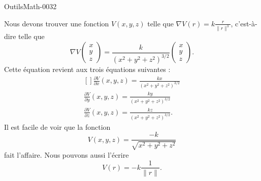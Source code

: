 
\begin{corrige}{OutilsMath-0032}

    Nous devons trouver une fonction $V(x,y,z)$ telle que $\nabla V(r)=k\frac{ r }{ \| r \|^3 }$, c'est-à-dire telle que
    \begin{equation}
        \nabla V\begin{pmatrix}
            x    \\ 
            y    \\ 
            z    
        \end{pmatrix}=\frac{ k }{ (x^2+y^2+z^2)^{3/2} }\begin{pmatrix}
            x    \\ 
            y    \\ 
            z    
        \end{pmatrix}.
    \end{equation}
    Cette équation revient aux trois équations suivantes :
    \begin{equation}
        \begin{aligned}[]
            \frac{ \partial V }{ \partial x }(x,y,z)=\frac{ kx }{ (x^2+y^2+z^2)^{3/2} }\\
            \frac{ \partial V }{ \partial y }(x,y,z)=\frac{ ky }{ (x^2+y^2+z^2)^{3/2} }\\
            \frac{ \partial V }{ \partial z }(x,y,z)=\frac{ kz }{ (x^2+y^2+z^2)^{3/2} }.
        \end{aligned}
    \end{equation}
    Il est facile de voir que la fonction
    \begin{equation}
        V(x,y,z)=\frac{ -k }{ \sqrt{x^2+y^2+z^2} }
    \end{equation}
    fait l'affaire. Nous pouvons aussi l'écrire
    \begin{equation}
        V(r)=-k\frac{1}{ \| r \| }.
    \end{equation}
\end{corrige}
